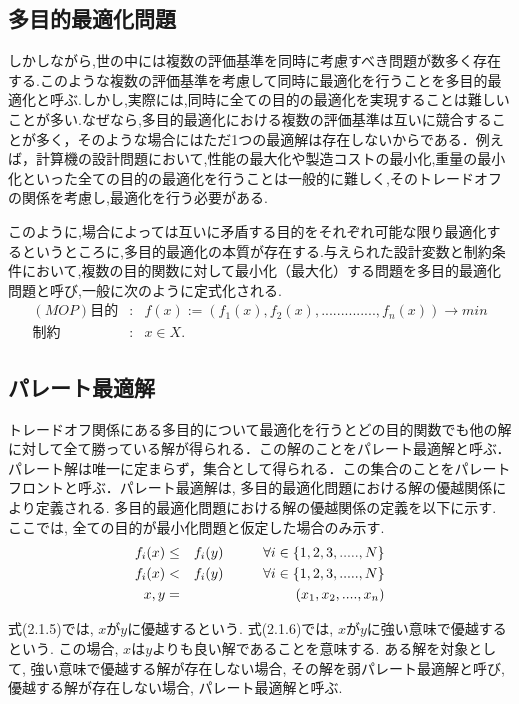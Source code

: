 \documentclass[12pt,a4j,notitlepage]{jreport}
\begin{document}
\subsection{多目的最適化問題}
しかしながら,世の中には複数の評価基準を同時に考慮すべき問題が数多く存在する.このような複数の評価基準を考慮して同時に最適化を行うことを多目的最適化と呼ぶ.しかし,実際には,同時に全ての目的の最適化を実現することは難しいことが多い.なぜなら,多目的最適化における複数の評価基準は互いに競合することが多く，そのような場合にはただ1つの最適解は存在しないからである．例えば，計算機の設計問題において,性能の最大化や製造コストの最小化,重量の最小化といった全ての目的の最適化を行うことは一般的に難しく,そのトレードオフの関係を考慮し,最適化を行う必要がある.

このように,場合によっては互いに矛盾する目的をそれぞれ可能な限り最適化するというところに,多目的最適化の本質が存在する.与えられた設計変数と制約条件において,複数の目的関数に対して最小化（最大化）する問題を多目的最適化問題と呼び,一般に次のように定式化される.
\begin{eqnarray}
(MOP)         目的&:& f(x):=(f_1(x),f_2(x),..............,f_n(x))　→　min\\
         制約&:&x    \in  X.
\end{eqnarray}

\subsection{パレート最適解}
トレードオフ関係にある多目的について最適化を行うとどの目的関数でも他の解に対して全て勝っている解が得られる．この解のことをパレート最適解と呼ぶ．パレート解は唯一に定まらず，集合として得られる．この集合のことをパレートフロントと呼ぶ．パレート最適解は, 多目的最適化問題における解の優越関係により定義される.
多目的最適化問題における解の優越関係の定義を以下に示す.
ここでは, 全ての目的が最小化問題と仮定した場合のみ示す.
\begin{eqnarray}
        f_i(x) &\leq & f_i(y)    \hspace{10mm}  \forall i \in \{1,2,3,.....,N\} \\
        f_i(x) & < & f_i(y)       \hspace{10mm} \forall i \in \{1,2,3,.....,N\} \\
        x,y &=& (x_1,x_2,....,x_n)
\end{eqnarray}

式(2.1.5)では, $x$が$y$に優越するという.
式(2.1.6)では, $x$が$y$に強い意味で優越するという.
この場合, $x$は$y$よりも良い解であることを意味する.
ある解を対象として, 強い意味で優越する解が存在しない場合, その解を弱パレート最適解と呼び, 優越する解が存在しない場合, パレート最適解と呼ぶ.
\end{document}
